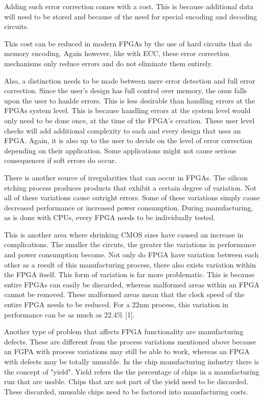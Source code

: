 \documentclass{article}
\begin{document}
    Adding such error correction comes with a cost. This is because additional data will
    need to be stored and because of the need for special encoding and decoding circuits.

    This cost can be reduced in modern FPGAs by the use of hard circuits that
    do memory encoding. Again however, like with ECC, these error correction mechanisms
    only reduce errors and do not eliminate them entirely.

    Also, a distinction needs to be made between mere error detection and full error correction.
    Since the user's design has full control over memory, the onus falls upon the user
    to hanlde errors. This is less desirable than handling errors at the FPGAs system level.
    This is because handling errors at the system level would only need to be done once,
    at the time of the FPGA's creation. These user level checks will add additional complexity
    to each and every design that uses an FPGA.
    Again, it is also up to the user to decide on the level of error correction depending
    on their application. Some applications might not cause serious consequences if
    soft errors do occur.

    There is another source of irregularities that can occur in FPGAs. The silicon etching
    process produces products that exhibit a certain degree of variation.
    Not all of these variations cause outright errors. Some of these variations simply
    cause decreased performance or increased power consumption. During manufacturing,
    as is done with CPUs, every FPGA needs to be individually tested.

    This is another area where shrinking CMOS sizes have caused an increase in complications.
    The smaller the circuts, the greater the variations in performance and power consumption
    become.
    Not only do FPGA have variation between each other as a result of this manufacturing process,
    there also exists variation within the FPGA itself. This form of variation
    is far more problematic. This is because entire FPGAs can easily be discarded,
    whereas malformed areas within an FPGA cannot be removed. These malformed areas
    mean that the clock speed of the entire FPGA needs to be reduced. For
    a 22nm process, this variation in performance can be as much as 22.4\% [1].

    Another type of problem that affects FPGA functionality are manufacturing defects.
    These are different from the process variations mentioned above because an FGPA
    with process variations may still be able to work, whereas an FPGA with defects
    may be totally unusable. In the chip manufacturing industry there is the concept of
    "yield". Yield refers the the percentage of chips in a manufacturing run that
    are usable. Chips that are not part of the yield need to be discarded. These
    discarded, unusable chips need to be factored into manufacturing costs.
\end{document}
